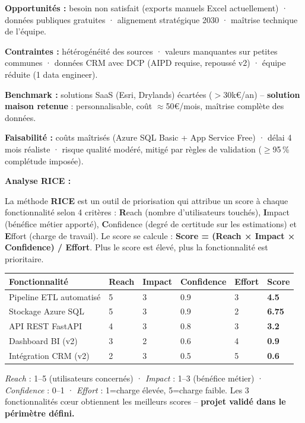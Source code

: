 \documentclass[11pt,a4paper]{article}
\begin{document}
\textbf{Opportunités :} besoin non satisfait (exports manuels Excel actuellement) · données publiques gratuites · alignement stratégique 2030 · maîtrise technique de l'équipe.

\textbf{Contraintes :} hétérogénéité des sources · valeurs manquantes sur petites communes · données CRM avec DCP (AIPD requise, repoussé v2) · équipe réduite (1 data engineer).

\textbf{Benchmark :} solutions SaaS (Esri, Drylands) écartées ($>$30k€/an) -- \textbf{solution maison retenue} : personnalisable, coût $\approx$50€/mois, maîtrise complète des données.

\textbf{Faisabilité :} coûts maîtrisés (Azure SQL Basic + App Service Free) · délai 4 mois réaliste · risque qualité modéré, mitigé par règles de validation ($\geq$95\,\% complétude imposée).

\textbf{Analyse RICE :}

{\small La méthode \textbf{RICE} est un outil de priorisation qui attribue un score à chaque fonctionnalité selon 4 critères : \textbf{R}each (nombre d'utilisateurs touchés), \textbf{I}mpact (bénéfice métier apporté), \textbf{C}onfidence (degré de certitude sur les estimations) et \textbf{E}ffort (charge de travail). Le score se calcule : \textbf{Score = (Reach × Impact × Confidence) / Effort}. Plus le score est élevé, plus la fonctionnalité est prioritaire.}

\vspace{0.3em}
\begin{tabular}{L{4.5cm} C{1.5cm} C{1.5cm} C{2cm} C{1.5cm} C{1.5cm}}
  \toprule
  \textbf{Fonctionnalité} & Reach & Impact & Confidence & Effort & \textbf{Score} \\
  \midrule
  Pipeline ETL automatisé & 5 & 3 & 0.9 & 3 & \textbf{4.5} \\
  Stockage Azure SQL & 5 & 3 & 0.9 & 2 & \textbf{6.75} \\
  API REST FastAPI & 4 & 3 & 0.8 & 3 & \textbf{3.2} \\
  Dashboard BI (v2) & 3 & 2 & 0.6 & 4 & \textbf{0.9} \\
  Intégration CRM (v2) & 2 & 3 & 0.5 & 5 & \textbf{0.6} \\
  \bottomrule
\end{tabular}

{\small \textit{Reach} : 1--5 (utilisateurs concernés) · \textit{Impact} : 1--3 (bénéfice métier) · \textit{Confidence} : 0--1 · \textit{Effort} : 1=charge élevée, 5=charge faible. Les 3 fonctionnalités cœur obtiennent les meilleurs scores -- \textbf{projet validé dans le périmètre défini.}}
\end{document}
